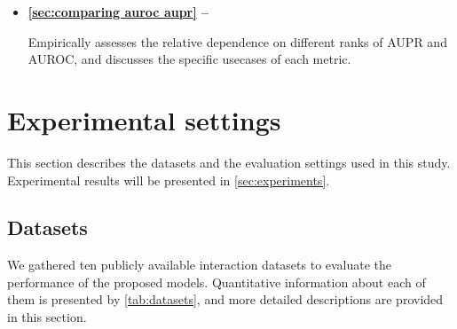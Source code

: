 \begin{mdframed}[frametitle={Related experiments}]
    \begin{itemize}
        \item \textbf{\autoref{sec:comparing auroc aupr} -- }

        Empirically assesses the relative dependence on different ranks of AUPR and AUROC, and discusses the specific usecases of each metric.
    \end{itemize}
\end{mdframed}


\section{Experimental settings}
\label{sec:exp settings}

This section describes the datasets and the evaluation settings used in this study. Experimental results will be presented in \autoref{sec:experiments}.

\subsection{Datasets}
\label{sec:datasets}


We gathered ten publicly available interaction datasets to evaluate the performance of the proposed models. Quantitative information about each of them is presented by \autoref{tab:datasets}, and more detailed descriptions are provided in this section.

